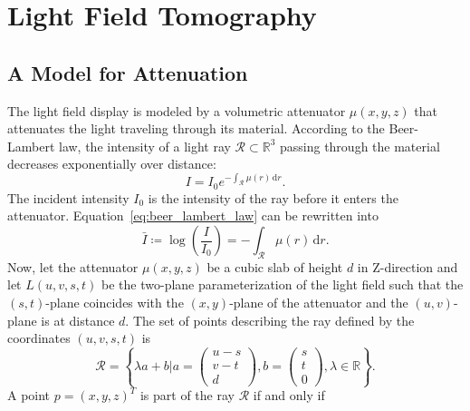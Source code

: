 \chapter{Light Field Tomography}

\section{A Model for Attenuation}

The light field display is modeled by a volumetric attenuator $\mu(x, y, z)$ that attenuates the light traveling through its material.
According to the Beer-Lambert law, the intensity of a light ray $\mathcal{R} \subset \mathbb{R}^3$ passing through the material decreases exponentially over distance:
\begin{equation}\label{eq:beer_lambert_law}
I = I_0 e^{-\int_\mathcal{R} \mu(r) \, \mathrm{d}r }.
\end{equation}
The incident intensity $I_0$ is the intensity of the ray before it enters the attenuator.
Equation~\ref{eq:beer_lambert_law} can be rewritten into 
\begin{equation}\label{eq:log_beer_lambert_law}
\bar{I} \coloneqq \log \left( \frac{I}{I_0} \right) = -\int_\mathcal{R} \mu(r) \, \mathrm{d}r.
\end{equation} 
Now, let the attenuator $\mu(x, y, z)$ be a cubic slab of height $d$ in Z-direction and let $L(u, v, s, t)$ be the two-plane parameterization of the light field such that the $(s, t)$-plane coincides with the $(x, y)$-plane of the attenuator and the $(u, v)$-plane is at distance $d$.
The set of points describing the ray defined by the coordinates $(u, v, s, t)$ is
\begin{equation}
\mathcal{R} = \left\{ \lambda a + b 
\mathrel{\bigg|} a = 
\begin{pmatrix}
u - s \\ 
v - t \\ 
d
\end{pmatrix}, 
b = 
\begin{pmatrix}
s \\ 
t \\ 
0
\end{pmatrix},
\lambda \in \mathbb{R} 
\right\}.
\end{equation}
A point $p = (x, y, z)^T$ is part of the ray $\mathcal{R}$ if and only if

